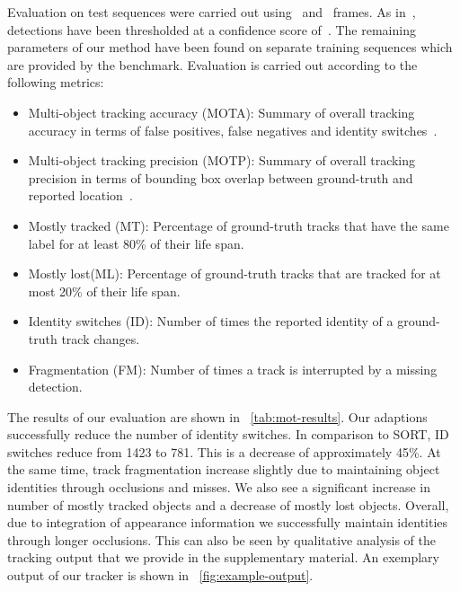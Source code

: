 \documentclass{article}
\begin{document}
Evaluation on test sequences were carried out using~
and~ frames.
As in~\cite{yu2016poi}, detections have been thresholded at a confidence score
of~.
The remaining parameters of our method have been found on separate training
sequences which are provided by the benchmark.
Evaluation is carried out according to the following metrics:
\begin{itemize}[leftmargin=*, noitemsep, topsep=0pt, parsep=0pt, partopsep=0pt]
\item Multi-object tracking accuracy (MOTA): Summary of overall tracking
    accuracy in terms of false positives, false negatives and identity
    switches~\cite{DBLP:journals/ejivp/BernardinS08}.
\item Multi-object tracking precision (MOTP): Summary of overall tracking
    precision in terms of bounding box overlap between ground-truth and
    reported location~\cite{DBLP:journals/ejivp/BernardinS08}.
\item Mostly tracked (MT): Percentage of ground-truth tracks that have the same
    label for at least 80\% of their life span.
\item Mostly lost(ML): Percentage of ground-truth tracks that are tracked for
    at most 20\% of their life span.
\item Identity switches (ID): Number of times the reported identity of a
    ground-truth track changes.
\item Fragmentation (FM): Number of times a track is interrupted by a missing
    detection.
\end{itemize}
The results of our evaluation are shown in \tablename~\ref{tab:mot-results}.
Our adaptions successfully reduce the number of identity switches.
In comparison to SORT, ID switches reduce from 1423 to 781.
This is a decrease of approximately 45\%.
At the same time, track fragmentation increase slightly due to maintaining
object identities through occlusions and misses.
We also see a significant increase in number of mostly tracked objects and
a decrease of mostly lost objects.
Overall, due to integration of appearance information we successfully maintain
identities through longer occlusions.
This can also be seen by qualitative analysis of the tracking output that
we provide in the supplementary material.
An exemplary output of our tracker is shown in
\figurename~\ref{fig:example-output}.
\end{document}

